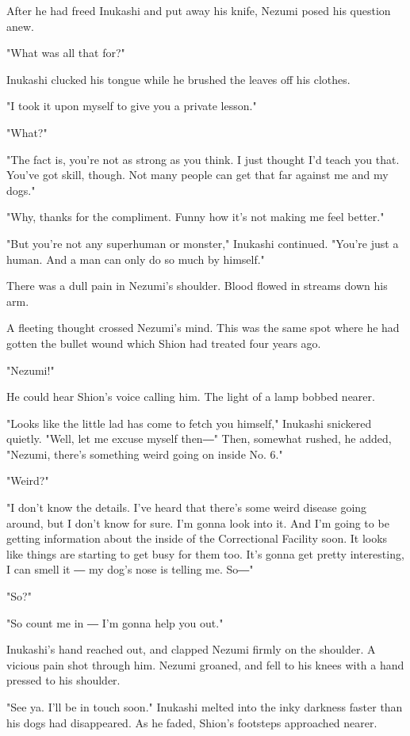 After he had freed Inukashi and put away his knife, Nezumi posed his
question anew.

"What was all that for?"

Inukashi clucked his tongue while he brushed the leaves off his clothes.

"I took it upon myself to give you a private lesson."

"What?"

"The fact is, you're not as strong as you think. I just thought I'd
teach you that. You've got skill, though. Not many people can get that
far against me and my dogs."

"Why, thanks for the compliment. Funny how it's not making me feel
better."

"But you're not any superhuman or monster," Inukashi continued. "You're
just a human. And a man can only do so much by himself."

There was a dull pain in Nezumi's shoulder. Blood flowed in streams down
his arm.

A fleeting thought crossed Nezumi's mind. This was the same spot where
he had gotten the bullet wound which Shion had treated four years ago.

"Nezumi!"

He could hear Shion's voice calling him. The light of a lamp bobbed
nearer.

"Looks like the little lad has come to fetch you himself," Inukashi
snickered quietly. "Well, let me excuse myself then―" Then, somewhat
rushed, he added, "Nezumi, there's something weird going on inside No.
6."

"Weird?"

"I don't know the details. I've heard that there's some weird disease
going around, but I don't know for sure. I'm gonna look into it. And I'm
going to be getting information about the inside of the Correctional
Facility soon. It looks like things are starting to get busy for them
too. It's gonna get pretty interesting, I can smell it ― my dog's nose
is telling me. So―"

"So?"

"So count me in ― I'm gonna help you out."

Inukashi's hand reached out, and clapped Nezumi firmly on the shoulder.
A vicious pain shot through him. Nezumi groaned, and fell to his knees
with a hand pressed to his shoulder.

"See ya. I'll be in touch soon." Inukashi melted into the inky darkness
faster than his dogs had disappeared. As he faded, Shion's footsteps
approached nearer.


